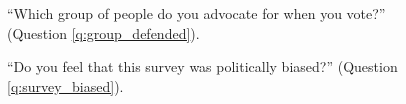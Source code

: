 \begin{figure}[h!]
    \caption[Moral circle]{``Which group of people do you advocate for when you vote?'' (Question \ref{q:group_defended}).
    }\label{fig:group_defended}
\end{figure}


\begin{figure}[h!]
    \caption[Feeling that the survey was politically biased]{``Do you feel that this survey was politically biased?'' (Question \ref{q:survey_biased}).
    }\label{fig:survey_biased}
\end{figure}


